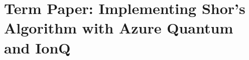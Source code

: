 \begin{comment}
\section{Module 10: Algorithms, part I - oracle problems Notes}


\section{Module 1 Quantum Strangeness Questions}


\section{Module 2 Quantum Linear Algebra, Part I Questions}


\section{Module 3 The Single Qubit Questions}


\section{Module 4: Quantum linear algebra, part II Questions}


\section{Module 5: Multiple qubits, part I Questions}


\section{Module 6: Multiple qubits, part II Questions}


\section{Module 7: Interlude: Principles of quantum mechanics Questions}


\section{Module 8: Quantum circuits - reversible construction Questions}


%

\section{Module 10: Algorithms, part I Questions}


\end{comment}

\section{Term Paper: Implementing Shor's Algorithm with Azure Quantum and IonQ} 





